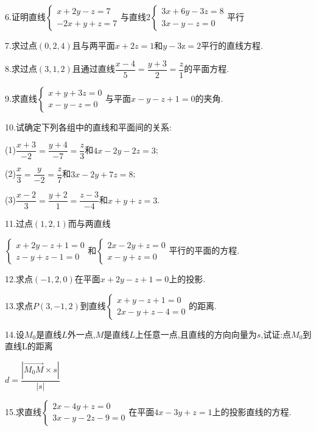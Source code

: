 \documentclass[oneside]{book}
\begin{document}
6.证明直线$\left\{\begin{array}{l}{x+2 y-z=7} \\ {-2 x+y+z=7}\end{array}\right.$与直线2$\left\{\begin{array}{l}{3 x+6 y-3 z=8} \\ {3 x-y-z=0}\end{array}\right.$平行

7.求过点$(0,2,4)$且与两平面$x + 2z = 1$和$y - 3{\text{z}} = 2$平行的直线方程.

8.求过点$(3,1,2)$且通过直线$\dfrac{{x - 4}}{5} = \dfrac{{y + 3}}{2} = \dfrac{z}{1}$的平面方程.

9.求直线$\left\{\begin{array}{l}{x+y+3 z=0} \\ {x-y-z=0}\end{array}\right.$与平面$x - y - z + 1 = 0$的夹角.

10.试确定下列各组中的直线和平面间的关系:

(1)$\dfrac{{x + 3}}{{ - 2}} = \dfrac{{y + 4}}{{ - 7}} = \dfrac{z}{3}$和$4x - 2y - 2z = 3$;

(2)$\dfrac{x}{3} = \dfrac{y}{{ - 2}} = \dfrac{z}{7}$和$3x - 2y + 7z = 8$;

(3)$\dfrac{{x - 2}}{3} = \dfrac{{y + 2}}{1} = \dfrac{{z - 3}}{{ - 4}}$和$x + y + z = 3$.

11.过点$(1,2,1)$而与两直线

$\left\{\begin{array}{l}{x+2 y-z+1=0} \\ {z-y+z-1=0}\end{array}\right.$和$\left\{\begin{array}{l}{2 x-2 y+z=0} \\ {x-y+z=0}\end{array}\right.$平行的平面的方程.

12.求点$(-1,2,0)$在平面$x + 2y - z + 1 = 0$上的投影.

13.求点$P(3, - 1,2)$到直线$\left\{\begin{array}{l}{x+y-z+1=0} \\ {2 x-y+z-4=0}\end{array}\right.$的距离.

14.设${M_0}$是直线$L$外一点,$M$是直线$L$上任意一点,且直线的方向向量为$s$,试证:点${M_0}$到直线L的距离

$d = \dfrac{{|\overrightarrow {{M_0}M}  \times s|}}{{|s|}}$

15.求直线$\left\{\begin{array}{l}{2 x-4 y+z=0} \\ {3 x-y-2 z-9=0}\end{array}\right.$在平面$4x - 3y + z = 1$上的投影直线的方程.
\end{document}
